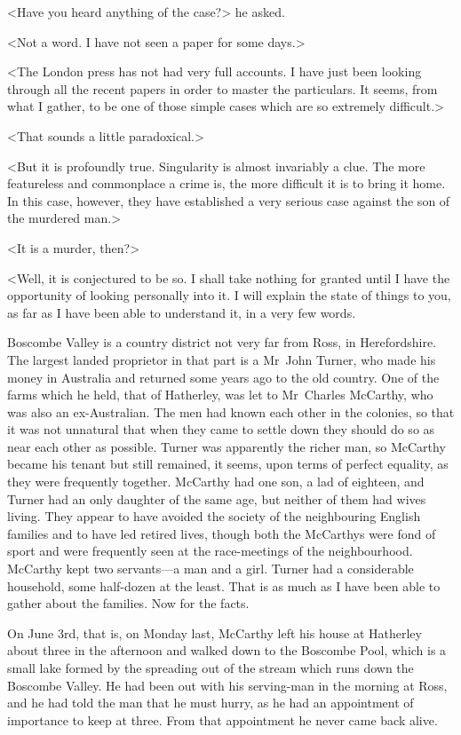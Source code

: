 <Have you heard anything of the case?> he asked.

<Not a word. I have not seen a paper for some days.>

<The London press has not had very full accounts. I have just been looking through all the recent papers in order to master the particulars. It seems, from what I gather, to be one of those simple cases which are so extremely difficult.>

<That sounds a little paradoxical.>

<But it is profoundly true. Singularity is almost invariably a clue. The more featureless and commonplace a crime is, the more difficult it is to bring it home. In this case, however, they have established a very serious case against the son of the murdered man.>

<It is a murder, then?>

<Well, it is conjectured to be so. I shall take nothing for granted until I have the opportunity of looking personally into it. I will explain the state of things to you, as far as I have been able to understand it, in a very few words.

Boscombe Valley is a country district not very far from Ross, in Herefordshire. The largest landed proprietor in that part is a Mr~John Turner, who made his money in Australia and returned some years ago to the old country. One of the farms which he held, that of Hatherley, was let to Mr~Charles McCarthy, who was also an ex-Australian. The men had known each other in the colonies, so that it was not unnatural that when they came to settle down they should do so as near each other as possible. Turner was apparently the richer man, so McCarthy became his tenant but still remained, it seems, upon terms of perfect equality, as they were frequently together. McCarthy had one son, a lad of eighteen, and Turner had an only daughter of the same age, but neither of them had wives living. They appear to have avoided the society of the neighbouring English families and to have led retired lives, though both the McCarthys were fond of sport and were frequently seen at the race-meetings of the neighbourhood. McCarthy kept two servants—a man and a girl. Turner had a considerable household, some half-dozen at the least. That is as much as I have been able to gather about the families. Now for the facts.

On June 3rd, that is, on Monday last, McCarthy left his house at Hatherley about three in the afternoon and walked down to the Boscombe Pool, which is a small lake formed by the spreading out of the stream which runs down the Boscombe Valley. He had been out with his serving-man in the morning at Ross, and he had told the man that he must hurry, as he had an appointment of importance to keep at three. From that appointment he never came back alive.

